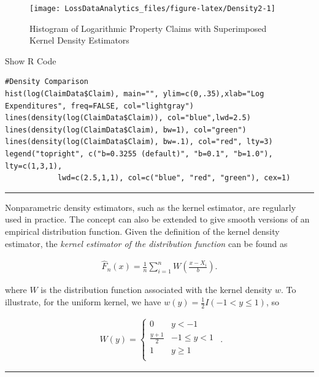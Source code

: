 \documentclass[]{book}
\theoremstyle{definition}
\theoremstyle{definition}
\theoremstyle{definition}
\theoremstyle{remark}
\begin{document}
\begin{figure}

{\centering \texttt{[image: LossDataAnalytics\_files/figure-latex/Density2-1]} 

}

\caption{Histogram of Logarithmic Property Claims with Superimposed Kernel Density Estimators}\label{fig:Density2}
\end{figure}

Show R Code

\hypertarget{togglekpdf}{}
\begin{verbatim}
#Density Comparison
hist(log(ClaimData$Claim), main="", ylim=c(0,.35),xlab="Log Expenditures", freq=FALSE, col="lightgray")
lines(density(log(ClaimData$Claim)), col="blue",lwd=2.5)
lines(density(log(ClaimData$Claim), bw=1), col="green")
lines(density(log(ClaimData$Claim), bw=.1), col="red", lty=3)
legend("topright", c("b=0.3255 (default)", "b=0.1", "b=1.0"), lty=c(1,3,1),
            lwd=c(2.5,1,1), col=c("blue", "red", "green"), cex=1)
\end{verbatim}

\begin{center}\rule{0.5\linewidth}{\linethickness}\end{center}

Nonparametric density estimators, such as the kernel estimator, are
regularly used in practice. The concept can also be extended to give
smooth versions of an empirical distribution function. Given the
definition of the kernel density estimator, the \emph{kernel estimator
of the distribution function} can be found as

\[
\begin{aligned}
\hat{F}_n(x) = \frac{1}{n} \sum_{i=1}^n W\left(\frac{x-X_i}{b}\right).\end{aligned}
\]

where \(W\) is the distribution function associated with the kernel
density \(w\). To illustrate, for the uniform kernel, we have
\(w(y) = \frac{1}{2}I(-1 < y \le 1)\), so

\[
\begin{aligned}
W(y) =
\begin{cases}
0 &            y<-1\\
\frac{y+1}{2}& -1 \le y < 1 \\
1 & y \ge 1 \\
\end{cases}\end{aligned} .
\]

\begin{center}\rule{0.5\linewidth}{\linethickness}\end{center}
\end{document}
